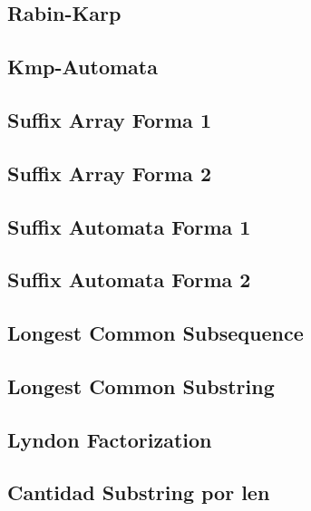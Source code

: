 \subsection{Rabin-Karp}
\raggedbottom
\hrulefill
\subsection{Kmp-Automata}
\raggedbottom
\hrulefill
\subsection{Suffix Array Forma 1}
\raggedbottom
\hrulefill
\subsection{Suffix Array Forma 2}
\raggedbottom
\hrulefill
\subsection{Suffix Automata Forma 1}
\raggedbottom
\hrulefill
\subsection{Suffix Automata Forma 2}
\raggedbottom
\hrulefill
\subsection{Longest Common Subsequence}
\raggedbottom
\hrulefill
\subsection{Longest Common Substring}
\raggedbottom
\hrulefill
\subsection{Lyndon Factorization}
\raggedbottom
\hrulefill
\subsection{Cantidad Substring por len}
\raggedbottom
\hrulefill

